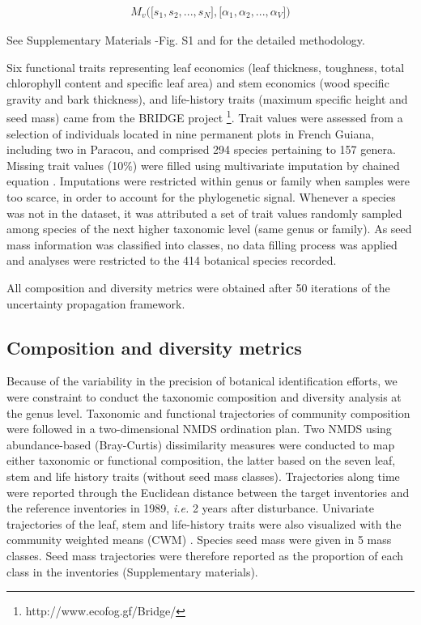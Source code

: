 \documentclass[fleqn,10pt]{ArtEcoFoG} %
\begin{document}
\begin{align}
M_v\Big(\big[s_1, s_2,..., s_N\big],\big[\alpha_1, \alpha_2,..., \alpha_V\big]\Big) \nonumber
\end{align}

See Supplementary Materials -Fig. S1 and \citet{Aubry-Kientz2013} for
the detailed methodology.

Six functional traits representing leaf economics (leaf thickness,
toughness, total chlorophyll content and specific leaf area) and stem
economics (wood specific gravity and bark thickness), and life-history
traits (maximum specific height and seed mass) came from the BRIDGE
project \footnote{http://www.ecofog.gf/Bridge/}. Trait values were
assessed from a selection of individuals located in nine permanent plots
in French Guiana, including two in Paracou, and comprised 294 species
pertaining to 157 genera. Missing trait values (10\%) were filled using
multivariate imputation by chained equation \citep{Mice2011}.
Imputations were restricted within genus or family when samples were too
scarce, in order to account for the phylogenetic signal. Whenever a
species was not in the dataset, it was attributed a set of trait values
randomly sampled among species of the next higher taxonomic level (same
genus or family). As seed mass information was classified into classes,
no data filling process was applied and analyses were restricted to the
414 botanical species recorded.

All composition and diversity metrics were obtained after 50 iterations
of the uncertainty propagation framework.

\subsection{Composition and diversity
metrics}\label{composition-and-diversity-metrics}

Because of the variability in the precision of botanical identification
efforts, we were constraint to conduct the taxonomic composition and
diversity analysis at the genus level. Taxonomic and functional
trajectories of community composition were followed in a two-dimensional
NMDS ordination plan. Two NMDS using abundance-based (Bray-Curtis)
dissimilarity measures were conducted to map either taxonomic or
functional composition, the latter based on the seven leaf, stem and
life history traits (without seed mass classes). Trajectories along time
were reported through the Euclidean distance between the target
inventories and the reference inventories in 1989, \emph{i.e.} 2 years
after disturbance. Univariate trajectories of the leaf, stem and
life-history traits were also visualized with the community weighted
means (CWM) \citep{Diaz2007}. Species seed mass were given in 5 mass
classes. Seed mass trajectories were therefore reported as the
proportion of each class in the inventories (Supplementary materials).
\end{document}
